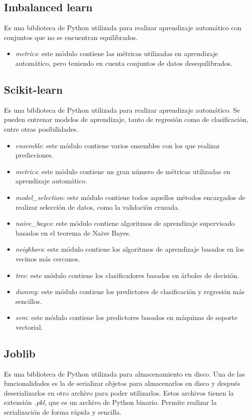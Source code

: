 \subsection{Imbalanced learn}
Es una biblioteca de Python utilizada para realizar aprendizaje automático con conjuntos que no se encuentran equilibrados.
\begin{itemize}
	\item \textit{metrics}: este módulo contiene las métricas utilizadas en aprendizaje automático, pero teniendo en cuenta conjuntos de datos desequilibrados. \cite{imblearn}
\end{itemize}

\subsection{Scikit-learn}
Es una biblioteca de Python utilizada para realizar aprendizaje automático. Se pueden entrenar modelos de aprendizaje, tanto de regresión como de clasificación, entre otras posibilidades.
\begin{itemize}
	\item \textit{ensemble}: este módulo contiene varios ensembles con los que realizar predicciones. \cite{skensemble}
	\item \textit{metrics}: este módulo contiene un gran número de métricas utilizadas en aprendizaje automático. \cite{skmetrics}
	\item \textit{model\_selection}: este módulo contiene todos aquellos métodos encargados de realizar selección de datos, como la validación cruzada. \cite{skmodsel}
	\item \textit{naive\_bayes}: este módulo contiene algoritmos de aprendizaje supervisado basados en el teorema de Naive Bayes. \cite{sknbayes}
	\item \textit{neighbors}: este módulo contiene los algoritmos de aprendizaje basados en los vecinos más cercanos. \cite{skneighbors}
	\item \textit{tree}: este módulo contiene los clasificadores basados en árboles de decisión. \cite{sktree}
	\item \textit{dummy}: este módulo contiene los predictores de clasificación y regresión más sencillos.
	\item \textit{svm}: este módulo contiene los predictores basados en máquinas de soporte vectorial. \cite{sksvm}
\end{itemize}

\subsection{Joblib}
Es una biblioteca de Python utilizada para almacenamiento en disco. Una de las funcionalidades es la de serializar objetos para almacenarlos en disco y después deserializarlos en otro archivo para poder utilizarlos. Estos archivos tienen la extensión \textit{.pkl}, que es un archivo de Python binario. Permite realizar la serialización de forma rápida y sencilla.
